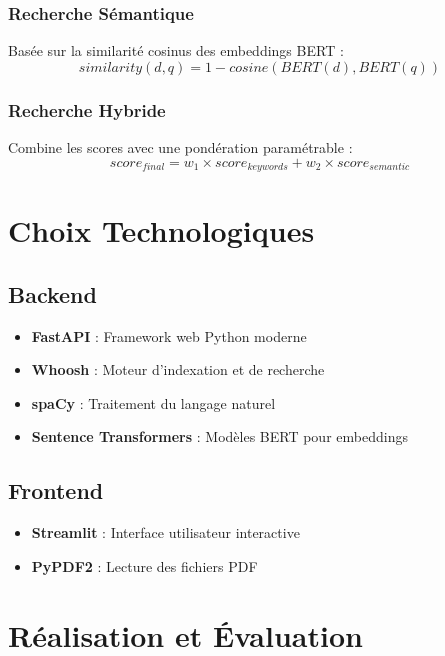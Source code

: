 \documentclass[12pt,a4paper]{article}
\begin{document}
\subsubsection{Recherche Sémantique}
Basée sur la similarité cosinus des embeddings BERT :
\begin{equation}
    similarity(d,q) = 1 - cosine(BERT(d), BERT(q))
\end{equation}

\subsubsection{Recherche Hybride}
Combine les scores avec une pondération paramétrable :
\begin{equation}
    score_{final} = w_1 \times score_{keywords} + w_2 \times score_{semantic}
\end{equation}

\section{Choix Technologiques}

\subsection{Backend}
\begin{itemize}
    \item \textbf{FastAPI} : Framework web Python moderne
    \item \textbf{Whoosh} : Moteur d'indexation et de recherche
    \item \textbf{spaCy} : Traitement du langage naturel
    \item \textbf{Sentence Transformers} : Modèles BERT pour embeddings
\end{itemize}

\subsection{Frontend}
\begin{itemize}
    \item \textbf{Streamlit} : Interface utilisateur interactive
    \item \textbf{PyPDF2} : Lecture des fichiers PDF
\end{itemize}

\section{Réalisation et Évaluation}
\end{document}
